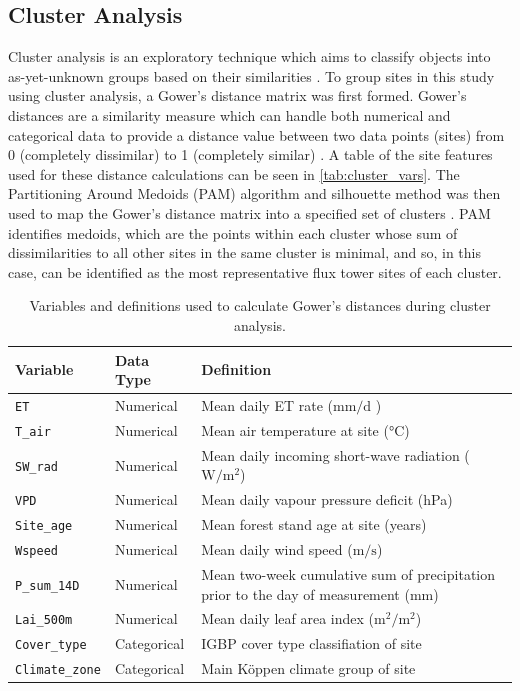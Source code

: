 \subsection{Cluster Analysis}
Cluster analysis is an exploratory technique which aims to classify objects into as-yet-unknown groups based on their similarities \parencite{landau2010cluster}. To group sites in this study using cluster analysis, a Gower's distance matrix was first formed. Gower's distances are a similarity measure which can handle both numerical and categorical data to provide a distance value between two data points (sites) from 0 (completely dissimilar) to 1 (completely similar) \parencite{gower1971}. A table of the site features used for these distance calculations can be seen in \autoref{tab:cluster_vars}. The Partitioning Around Medoids (PAM) algorithm and silhouette method was then used to map the Gower's distance matrix into a specified set of clusters \parencite{rousseeuw1990}. PAM identifies medoids, which are the points within each cluster whose sum of dissimilarities to all other sites in the same cluster is minimal, and so, in this case, can be identified as the most representative flux tower sites of each cluster.


\begin{table}[H]
	\caption{Variables and definitions used to calculate Gower's distances during cluster analysis.}
	\centering
	\begin{tabularx}{\linewidth}{llX}
		\toprule
		Variable & Data Type & Definition \\
		\midrule
		\texttt{ET} & Numerical &  Mean daily ET rate ($\si{\milli\metre\per\day}$ )\\
		\texttt{T\_air} & Numerical & Mean air temperature at site (\si{\degreeCelsius}) \\
		\texttt{SW\_rad} & Numerical & Mean daily incoming short-wave radiation ($\si{\watt\per\metre\squared}$) \\
		\texttt{VPD} & Numerical & Mean daily vapour pressure deficit (\si{\hecto\pascal}) \\
		\texttt{Site\_age} & Numerical & Mean forest stand age at site (years) \\
		\texttt{Wspeed} & Numerical & Mean daily wind speed ($\si{\meter\per\second}$) \\
		\texttt{P\_sum\_14D} & Numerical & Mean two-week cumulative sum of precipitation prior to the day of measurement ($\si{\milli\metre}$) \\
		\texttt{Lai\_500m} & Numerical & Mean daily leaf area index ($\si{\metre\squared\per\metre\squared}$) \\
		\texttt{Cover\_type} & Categorical & IGBP cover type classifiation of site \\
		\texttt{Climate\_zone} & Categorical & Main K\"{o}ppen climate group of site\\
	\end{tabularx}
	\label{tab:cluster_vars}
\end{table}






